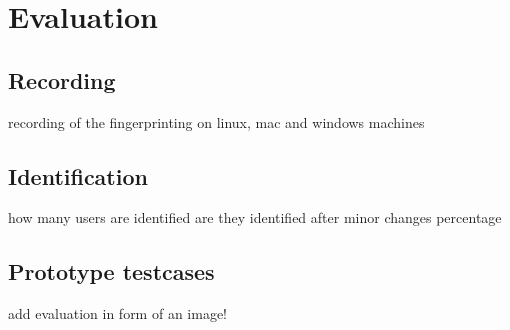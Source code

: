 \chapter{Evaluation}
\label{cha:evaluation}


\section{Recording}
recording of the fingerprinting
on linux, mac and windows machines

\section{Identification}
how many users are identified
are they identified after minor changes
percentage

\section{Prototype testcases}

add evaluation in form of an image!

